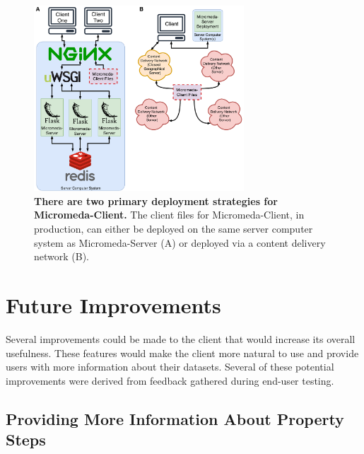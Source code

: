 \begin{figure}[!ht]
  \centering
	\includegraphics[width=0.7\textwidth]{media/micromeda-client-deployment.pdf}
	 \caption[There are two primary deployment strategies for Micromeda-Client. 
]{\textbf{There are two primary deployment strategies for Micromeda-Client.} The 
client files for Micromeda-Client, in production, can either be deployed on the 
same server computer system as Micromeda-Server (A) or deployed via a content 
delivery network (B).}
	 \label{fig:client-deployment}
\end{figure}

\section{Future Improvements} \label{client-improvements}

Several improvements could be made to the client that would increase its overall 
usefulness. These features would make the client more natural to use and provide 
users with more information about their datasets. Several of these potential 
improvements were derived from feedback gathered during end-user testing.

\subsection{Providing More Information About Property Steps}

